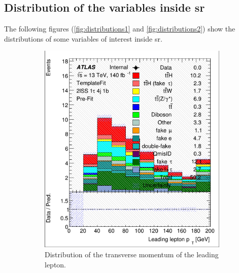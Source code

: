 \subsection{Distribution of the variables inside \gls{sr}}

The following figures (\autoref{fig:distributions1} and \autoref{fig:distributions2}) show the distributions of some variables
of interest inside \gls{sr}.

\captionsetup[subfigure]{justification=centering}
\begin{figure}[htb!]
    \centering
    \begin{subfigure}{0.45\textwidth}
        \includegraphics[width=\linewidth]{figures/plots/histograms/lep_pt_0.png}
        \caption{Distribution of the transverse momentum of the leading lepton.}
        \label{fig:lep_pt_0}
    \end{subfigure}\hfill%
    \begin{subfigure}{0.45\textwidth}

\end{subfigure}
\end{figure}
